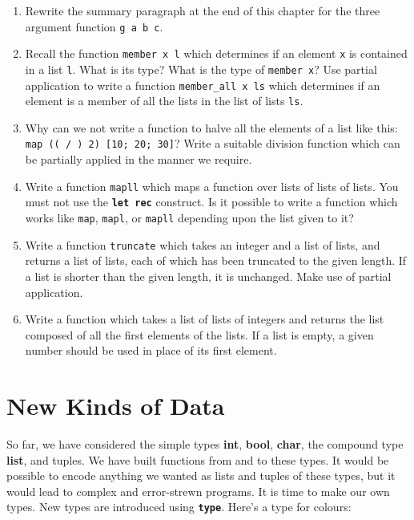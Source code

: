 \documentclass[]{book}
\begin{document}
\begin{enumerate}
  \item Rewrite the summary paragraph at the end of this chapter for the three argument function \texttt{g a b c}.
  \item Recall the function \texttt{member x l} which determines if an element \texttt{x} is contained in a list \texttt{l}. What is its type? What is the type of \texttt{member x}? Use partial application to write a function \texttt{member\_all x ls} which determines if an element is a member of all the lists in the list of lists \texttt{ls}. 
  \item Why can we not write a function to halve all the elements of a list like this: \texttt{map (( / ) 2) [10; 20; 30]}? Write a suitable division function which can be partially applied in the manner we require.
  \item Write a function \texttt{mapll} which maps a function over lists of lists of lists. You must not use the \textbf{\texttt{let rec}} construct. Is it possible to write a function which works like \texttt{map}, \texttt{mapl}, or \texttt{mapll} depending upon the list given to it?
  \item Write a function \texttt{truncate} which takes an integer and a list of lists, and returns a list of lists, each of which has been truncated to the given length. If a list is shorter than the given length, it is unchanged. Make use of partial application.
  \item Write a function which takes a list of lists of integers and returns the list composed of all the first elements of the lists. If a list is empty, a given number should be used in place of its first element.
\end{enumerate}

\cleardoublepage
\thispagestyle{empty}


\pagestyle{empty}


\chapter{New Kinds of Data}
\pagestyle{fancy}

So far, we have considered the simple types \textbf{\textsf{int}}, \textbf{\textsf{bool}}, \textbf{\textsf{char}}, the compound type \textbf{\textsf{list}}, and tuples. We have built functions from and to these types. It would be possible to encode anything we wanted as lists and tuples of these types, but it would lead to complex and error-strewn programs. It is time to make our own types. New types are introduced using \texttt{\textbf{type}}. Here's a type for colours:
\end{document}
